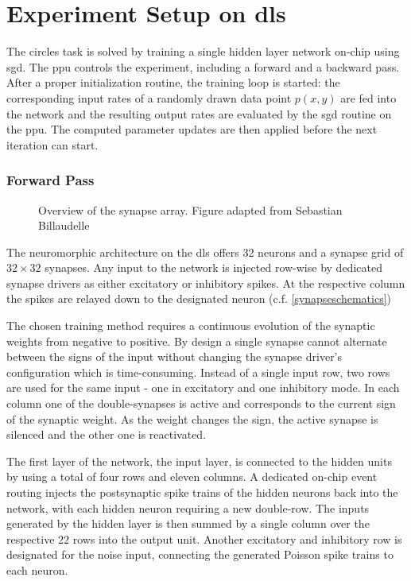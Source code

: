\section{Experiment Setup on \gls{dls}}
\label{circlesimplementation}
The circles task is solved by training a single hidden layer network on-chip using \acrlong{sgd}. The \gls{ppu} controls the experiment, including a forward and a backward pass. After a proper initialization routine, the training loop is started: the corresponding input rates of a randomly drawn data point $p(x,y)$ are fed into the network and the resulting output rates are evaluated by the \gls{sgd} routine on the \gls{ppu}. The computed parameter updates are then applied before the next iteration can start.

\subsubsection*{Forward Pass}

\begin{wrapfigure}{R}{0.35\textwidth}
	\centering
	
	\caption[Overview of the synapse array.]{Overview of the synapse array. Figure adapted from Sebastian Billaudelle} 
	\label{synapsearraysketch}
\end{wrapfigure}
The neuromorphic architecture on the \gls{dls} offers 32 neurons and a synapse grid of $32 \times 32$ synapses. Any input to the network is injected row-wise by dedicated synapse drivers as either excitatory or inhibitory spikes. At the respective column the spikes are relayed down to the designated neuron (c.f. \cref{synapseschematics})

The chosen training method requires a continuous evolution of the synaptic weights from negative to positive. By design a single synapse cannot alternate between the signs of the input without changing the synapse driver's configuration which is time-consuming. Instead of a single input row, two rows are used for the same input - one in excitatory and one inhibitory mode. In each column one of the double-synapses is active and corresponds to the current sign of the synaptic weight. As the weight changes the sign, the active synapse is silenced and the other one is reactivated. 

The first layer of the network, the input layer, is connected to the hidden units by using a total of four rows and eleven columns. A dedicated on-chip event routing injects the postsynaptic spike trains of the hidden neurons back into the network, with each hidden neuron requiring a new double-row. The inputs generated by the hidden layer is then summed by a single column over the respective $22$ rows into the output unit. Another excitatory and inhibitory row is designated for the noise input, connecting the generated Poisson spike trains to each neuron.

